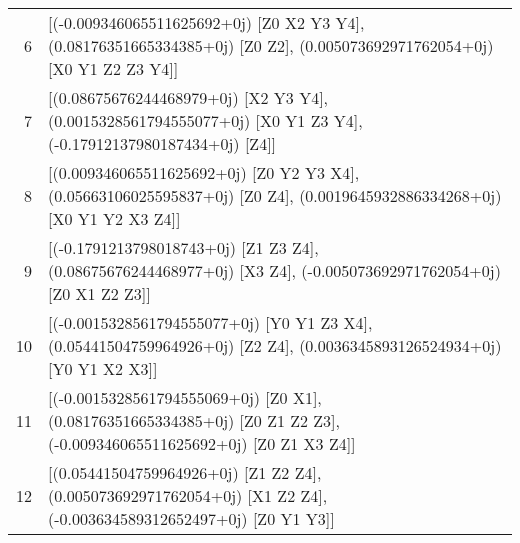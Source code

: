 \begin{tabular}{rl}
       6 &                                                                                                                                                                                                                                                 [(-0.009346065511625692+0j) [Z0 X2 Y3 Y4], (0.08176351665334385+0j) [Z0 Z2], (0.005073692971762054+0j) [X0 Y1 Z2 Z3 Y4]] \\
       7 &                                                                                                                                                                                                                                                          [(0.08675676244468979+0j) [X2 Y3 Y4], (0.0015328561794555077+0j) [X0 Y1 Z3 Y4], (-0.17912137980187434+0j) [Z4]] \\
       8 &                                                                                                                                                                                                                                                 [(0.009346065511625692+0j) [Z0 Y2 Y3 X4], (0.05663106025595837+0j) [Z0 Z4], (0.0019645932886334268+0j) [X0 Y1 Y2 X3 Z4]] \\
       9 &                                                                                                                                                                                                                                                        [(-0.1791213798018743+0j) [Z1 Z3 Z4], (0.08675676244468977+0j) [X3 Z4], (-0.005073692971762054+0j) [Z0 X1 Z2 Z3]] \\
      10 &                                                                                                                                                                                                                                                  [(-0.0015328561794555077+0j) [Y0 Y1 Z3 X4], (0.05441504759964926+0j) [Z2 Z4], (0.0036345893126524934+0j) [Y0 Y1 X2 X3]] \\
      11 &                                                                                                                                                                                                                                                  [(-0.0015328561794555069+0j) [Z0 X1], (0.08176351665334385+0j) [Z0 Z1 Z2 Z3], (-0.009346065511625692+0j) [Z0 Z1 X3 Z4]] \\
      12 &                                                                                                                                                                                                                                                       [(0.05441504759964926+0j) [Z1 Z2 Z4], (0.005073692971762054+0j) [X1 Z2 Z4], (-0.003634589312652497+0j) [Z0 Y1 Y3]] \\

\end{tabular}
